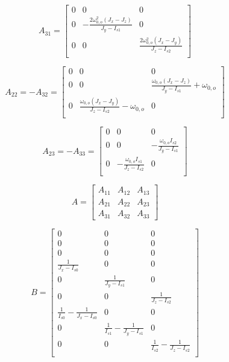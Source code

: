 \[
A_{31} = 
\begin{bmatrix}
	0  & 0 & 0 \\
	0 &  - \frac{2 \omega_{0,o}^2 \left(J_x - J_z\right)}{J_y - I_{s1}}
	& 0 \\
	0 & 0 &  \frac{2 \omega_{0,o}^2 \left(J_x - J_y\right)}{J_z - I_{s2}}
	\\
\end{bmatrix}
\]

\[
A_{22} = -A_{32} = 
\begin{bmatrix}
	0  & 0 & 0 \\
	0  & 0 & \frac{\omega_{0,o} \left(J_x - J_z\right)}{J_y - I_{s1}} + \omega_{0,o} \\
	0 & \frac{\omega_{0,o} \left(J_x - J_y\right)}{J_z - I_{s2}} - \omega_{0,o} & 0	\\
\end{bmatrix}
\]

\[
A_{23} = -A_{33} = 
\begin{bmatrix}
	0 & 0 & 0 \\
	0 & 0 & -\frac{\omega_{0,o} I_{s2}}{J_y - I_{s1}}
	\\
	0 & -\frac{\omega_{0,o} I_{s1}}{J_z - I_{s2}}
	& 0 \\
\end{bmatrix}
\]

\[
A =
\begin{bmatrix}
	A_{11} & A_{12} & A_{13} \\
	A_{21} & A_{22} & A_{23} \\
	A_{31} & A_{32} & A_{33}
\end{bmatrix}
\]

\[
B =
\begin{bmatrix}
	0 & 0 & 0 \\
	0 & 0 & 0 \\
	0 & 0 & 0 \\
	\frac{1}{J_{x}-I_{s0}} & 0 & 0 \\
	0 & \frac{1}{J_{y}-I_{s1}} & 0 \\
	0 & 0 & \frac{1}{J_{z}-I_{s2}} \\
	\frac{1}{I_{s0}} - \frac{1}{J_{x}-I_{s0}} & 0 & 0 \\
	0 & \frac{1}{I_{s1}} - \frac{1}{J_{y}-I_{s1}} & 0 \\
	0 & 0 & \frac{1}{I_{s2}} - \frac{1}{J_{z}-I_{s2}} \\
\end{bmatrix}
\]